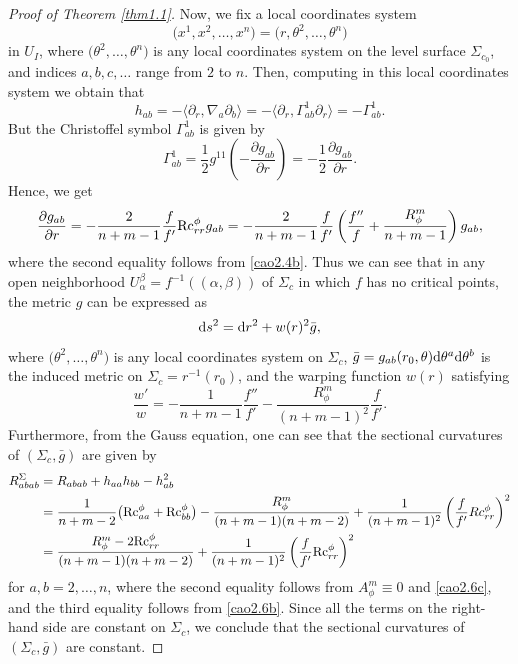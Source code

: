 \documentclass[10pt,a4paper]{amsart}
\numberwithin{equation}{section}
\begin{document}
\begin{proof}[Proof of Theorem \ref{thm1.1}]
Now, we fix a local coordinates system
\begin{equation*}
 \bigl(x^1,x^2,\dotsc,x^n\bigr)=\bigl(r,\theta^2,\dotsc,\theta^n\bigr)
\end{equation*}
in $U_I$, where $\bigl(\theta^2,\dotsc,\theta^n\bigr)$ is any local coordinates system on the level surface $\Sigma_{c_0}$, and indices $a,b,c,\dotsc$ range from $2$ to $n$. Then, computing in this local coordinates system we obtain that
\begin{equation*}
 h_{ab}=-\langle \partial_r,\nabla_a\partial_b\rangle=-\bigr\langle \partial_r,\Gamma_{ab}^1\partial_r\bigl\rangle =-\Gamma_{ab}^1.
\end{equation*}
But the Christoffel symbol $\Gamma_{ab}^1$ is given by
\begin{equation*}
 \Gamma_{ab}^1=\frac{1}{2}g^{11}\left(-\frac{\partial g_{ab}}{\partial r}\right)=-\frac{1}{2}\frac{\partial g_{ab}}{\partial r}.
\end{equation*}
Hence, we get
\begin{equation*}
 \frac{\partial g_{ab}}{\partial r}=-\frac{2}{n+m-1}\frac{f}{f'}{\rm Rc}^\phi_{rr}g_{ab}=-\frac{2}{n+m-1}\frac{f}{f'}\left(\frac{f''}{f}+\frac{R_\phi^m}{n+m-1}\right)g_{ab},
\end{equation*}
where the second equality follows from \eqref{cao2.4b}.
Thus we can see that in any open neighborhood $U_{\alpha}^\beta=f^{-1} ((\alpha,\beta) )$ of $\Sigma_c$ in which $f$ has no critical points, the metric $g$ can be expressed as
\begin{equation*}
 {\rm d}s^2={\rm d}r^2+w(r)^2\bar{g},
\end{equation*}
where $\bigl(\theta^2,\dots,\theta^n\bigr)$ is any local coordinates system on $\Sigma_c$, $\bar{g}=g_{ab}(r_0,\theta){\rm d}\theta^a{\rm d}\theta^b$ is the induced metric on $\Sigma_c=r^{-1}(r_0)$, and the warping function $w(r)$ satisfying
\begin{equation*}
 \frac{w'}{w}=-\frac{1}{n+m-1}\frac{f''}{f'}-\frac{R_\phi^m}{(n+m-1)^2}\frac{f}{f'}.
\end{equation*}
Furthermore, from the Gauss equation, one can see that the sectional curvatures of $(\Sigma_c,\bar{g})$ are given by
\begin{align*}
 R_{abab}^\Sigma&= R_{abab}+h_{aa}h_{bb}-h_{ab}^2\\
& = \frac{1}{n+m-2}\bigl({\rm Rc}^\phi_{aa}+{\rm Rc}^\phi_{bb}\bigr)-\frac{R_\phi^m}{(n+m-1)(n+m-2)}+\frac{1}{(n+m-1)^2}\left(\frac{f}{f'}Rc^\phi_{rr}\right)^2\\
& = \frac{R_\phi^m-2{\rm Rc}^\phi_{rr}}{(n+m-1)(n+m-2)}+\frac{1}{(n+m-1)^2}\left(\frac{f}{f'}{\rm Rc}^\phi_{rr}\right)^2
\end{align*}
for $a,b=2,\dots,n$, where the second equality follows from $A_\phi^m\equiv 0$ and \eqref{cao2.6c},
 and the third equality follows from \eqref{cao2.6b}. Since all the terms on the right-hand side are constant on $\Sigma_c$, we conclude that the sectional curvatures of $(\Sigma_c,\bar{g})$ are constant.
\end{proof}
\end{document}
